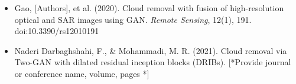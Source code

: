\begin{itemize}
    \item Gao, [Authors], et al. (2020). Cloud removal with fusion of high-resolution optical and SAR images using GAN. \textit{Remote Sensing}, 12(1), 191. doi:10.3390/rs12010191

    \item Naderi Darbaghshahi, F., & Mohammadi, M. R. (2021). Cloud removal via Two-GAN with dilated residual inception blocks (DRIBs). [*Provide journal or conference name, volume, pages *]

    
\end{itemize}

